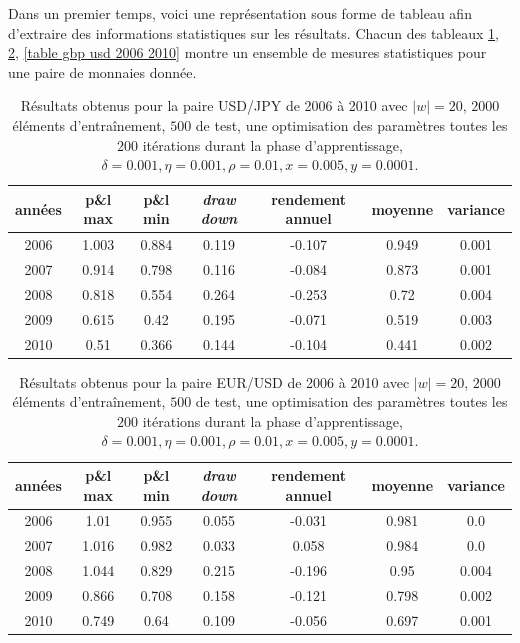 \documentclass[a4paper, 11pt]{article}
\begin{document}
Dans un premier temps, voici une représentation sous forme de tableau afin d'extraire des informations statistiques sur les résultats. Chacun des tableaux \ref{table usd jpy 2006 2010}, \ref{table eur usd 2006 2010}, \ref{table gbp usd 2006 2010} montre un ensemble de mesures statistiques pour une paire de monnaies donnée.

\begin{table}[h!]
	\centering
	\begin{tabular}{|c|c|c|c|c|c|c|}
		\hline
			années & p\&l max & p\&l min & \textit{draw down} & rendement annuel & moyenne & variance\\
			\hline
			2006 & 1.003 & 0.884 & 0.119 & -0.107 & 0.949 & 0.001\\
			\hline
			2007 & 0.914 & 0.798 & 0.116 & -0.084 & 0.873 & 0.001\\
			\hline
			2008 & 0.818 & 0.554 & 0.264 & -0.253 & 0.72 & 0.004\\
			\hline
			2009 & 0.615 & 0.42 & 0.195 & -0.071 & 0.519 & 0.003\\
			\hline
			2010 & 0.51 & 0.366 & 0.144 & -0.104 & 0.441 & 0.002\\
			\hline
	\end{tabular}
\caption{Résultats obtenus pour la paire USD/JPY de 2006 à 2010 avec $|w| = 20$, $2000$ éléments d'entraînement, $500$ de test, une optimisation des
	paramètres toutes les $200$ itérations durant la phase d'apprentissage, $\delta = 0.001, \eta=0.001,\rho=0.01, x = 0.005, y=0.0001$.}
\label{table usd jpy 2006 2010}
\end{table}

\begin{table}[h!]
	\centering
	\begin{tabular}{|c|c|c|c|c|c|c|}
		\hline
		années & p\&l max & p\&l min & \textit{draw down} & rendement annuel & moyenne & variance\\
		\hline
		2006 & 1.01 & 0.955 & 0.055 & -0.031 & 0.981 & 0.0\\
		\hline
		2007 & 1.016 & 0.982 & 0.033 & 0.058 & 0.984 & 0.0\\
		\hline
		2008 & 1.044 & 0.829 & 0.215 & -0.196 & 0.95 & 0.004\\
		\hline
		2009 & 0.866 & 0.708 & 0.158 & -0.121 & 0.798 & 0.002\\
		\hline
		2010 & 0.749 & 0.64 & 0.109 & -0.056 & 0.697 & 0.001\\
		\hline
	\end{tabular}
\caption{Résultats obtenus pour la paire EUR/USD de 2006 à 2010 avec $|w| = 20$, $2000$ éléments d'entraînement, $500$ de test, une optimisation des
	paramètres toutes les $200$ itérations durant la phase d'apprentissage, $\delta = 0.001, \eta=0.001,\rho=0.01, x = 0.005, y=0.0001$.}
\label{table eur usd 2006 2010}
\end{table}
\end{document}

